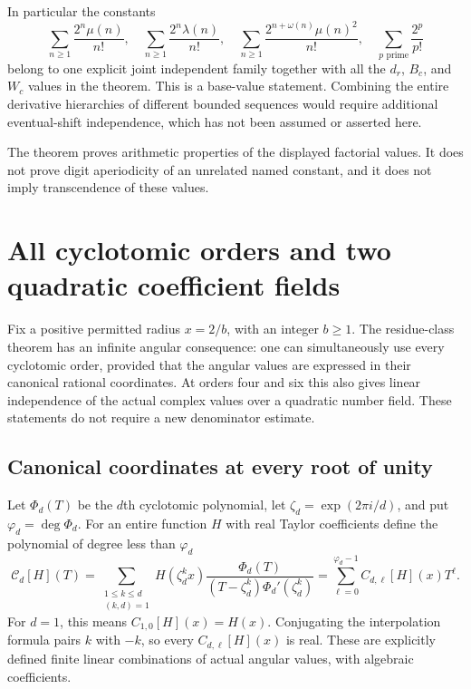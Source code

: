 In particular the constants
\[
 \sum_{n\geq1}\frac{2^n\mu(n)}{n!},\quad
 \sum_{n\geq1}\frac{2^n\lambda(n)}{n!},\quad
 \sum_{n\geq1}\frac{2^{n+\omega(n)}\mu(n)^2}{n!},\quad
 \sum_{p\text{ prime}}\frac{2^p}{p!}
\]
belong to one explicit joint independent family together with all the
$d_r$, $B_c$, and $W_c$ values in the theorem.  This is a base-value
statement.  Combining the entire derivative hierarchies of different
bounded sequences would require additional eventual-shift independence,
which has not been assumed or asserted here.

The theorem proves arithmetic properties of the displayed factorial
values.  It does not prove digit aperiodicity of an unrelated named
constant, and it does not imply transcendence of these values.

\section{All cyclotomic orders and two quadratic coefficient fields}
\label{sec:cyclotomic-v5}

Fix a positive permitted radius $x=2/b$, with an integer $b\geq1$.  The residue-class
theorem has an infinite angular consequence: one can simultaneously use
every cyclotomic order, provided that the angular values are expressed in
their canonical rational coordinates.  At orders four and six this also
gives linear independence of the actual complex values over a quadratic
number field.  These statements do not require a new denominator estimate.

\subsection{Canonical coordinates at every root of unity}

Let $\Phi_d(T)$ be the $d$th cyclotomic polynomial, let
$\zeta_d=\exp(2\pi i/d)$, and put $\varphi_d=\deg\Phi_d$.
For an entire function $H$ with real Taylor coefficients define the
polynomial of degree less than $\varphi_d$
\begin{equation}\label{eq:cyclotomic-interpolant-v5}
 \mathcal C_d[H](T)=
 \sum_{\substack{1\leq k\leq d\\(k,d)=1}}
 H(\zeta_d^k x)
 \frac{\Phi_d(T)}{(T-\zeta_d^k)\Phi_d'(\zeta_d^k)}
 =\sum_{\ell=0}^{\varphi_d-1}C_{d,\ell}[H](x)T^\ell.
\end{equation}
For $d=1$, this means $C_{1,0}[H](x)=H(x)$.
Conjugating the interpolation formula pairs $k$ with $-k$, so every
$C_{d,\ell}[H](x)$ is real.  These are explicitly defined finite linear
combinations of actual angular values, with algebraic coefficients.

